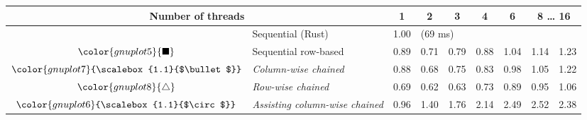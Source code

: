 \begin{tabular}{clrrrrrrr}
\toprule
\multicolumn{2}{c}{\textbf{Number of threads}} & \multicolumn{1}{c}{\textbf{ 1 }} & \multicolumn{1}{c}{\textbf{ 2 }} & \multicolumn{1}{c}{\textbf{ 3 }} & \multicolumn{1}{c}{\textbf{ 4 }} & \multicolumn{1}{c}{\textbf{ 6 }} & \multicolumn{2}{c}{\textbf{ 8 } \dots \textbf{ 16 }} \\
\midrule
& Sequential (Rust) & \multicolumn{1}{r}{ 1.00 } & \multicolumn{ 6 }{l}{(69 ms)} \\
\rowcolor{gnuplot5!10}$\color{gnuplot5}{\blacksquare}$ & Sequential row-based & \cellcolor{gnuplot5!10} 0.89 & \cellcolor{gnuplot5!10} 0.71 & \cellcolor{gnuplot5!10} 0.79 & \cellcolor{gnuplot5!10} 0.88 & \cellcolor{gnuplot5!10} 1.04 & \cellcolor{gnuplot5!10} 1.14 & \cellcolor{gnuplot5!10} 1.23 \\
\rowcolor{gnuplot7!30}$\color{gnuplot7}{\scalebox{1.1}{$\bullet$}}$ & \textit{Column-wise chained} & \cellcolor{gnuplot7!30} 0.88 & \cellcolor{gnuplot7!30} 0.68 & \cellcolor{gnuplot7!30} 0.75 & \cellcolor{gnuplot7!30} 0.83 & \cellcolor{gnuplot7!30} 0.98 & \cellcolor{gnuplot7!30} 1.05 & \cellcolor{gnuplot7!30} 1.22 \\
\rowcolor{gnuplot8!30}$\color{gnuplot8}{\triangle}$ & \textit{Row-wise chained} & \cellcolor{gnuplot8!30} 0.69 & \cellcolor{gnuplot8!30} 0.62 & \cellcolor{gnuplot8!30} 0.63 & \cellcolor{gnuplot8!30} 0.73 & \cellcolor{gnuplot8!30} 0.89 & \cellcolor{gnuplot8!30} 0.95 & \cellcolor{gnuplot8!30} 1.06 \\
\rowcolor{gnuplot6!30}$\color{gnuplot6}{\scalebox{1.1}{$\circ$}}$ & \textit{Assisting column-wise chained} & \cellcolor{gnuplot6!30} 0.96 & \cellcolor{gnuplot6!30} 1.40 & \cellcolor{gnuplot6!30} 1.76 & \cellcolor{gnuplot6!30} 2.14 & \cellcolor{gnuplot6!30} 2.49 & \cellcolor{gnuplot6!30} 2.52 & \cellcolor{gnuplot6!30} 2.38 \\
\bottomrule
\end{tabular}
